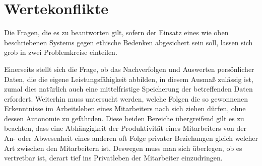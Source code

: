 \documentclass[a4paper,12pt,]{article}
\begin{document}
\section{Wertekonflikte}

Die Fragen, die es zu beantworten gilt, sofern der Einsatz eines wie oben beschriebenen Systems gegen ethische Bedenken abgesichert sein soll, lassen sich grob in zwei Problemkreise einteilen.

Einerseits stellt sich die Frage, ob das Nachverfolgen und Auswerten persönlicher Daten, die die eigene Leistungsfähigkeit abbilden, in diesem Ausmaß zulässig ist, zumal dies natürlich auch eine mittelfristige Speicherung der betreffenden Daten erfordert. Weiterhin muss untersucht werden, welche Folgen die so gewonnenen Erkenntnisse im Arbeitsleben eines Mitarbeiters nach sich ziehen dürfen, ohne dessen Autonomie zu gefährden. Diese beiden Bereiche übergreifend gilt es zu beachten, dass eine Abhängigkeit der Produktivität eines Mitarbeiters von der An- oder Abwesenheit eines anderen oft Folge privater Beziehungen gleich welcher Art zwischen den Mitarbeitern ist. Deswegen muss man sich überlegen, ob es vertretbar ist, derart tief ins Privatleben der Mitarbeiter einzudringen.
\end{document}
